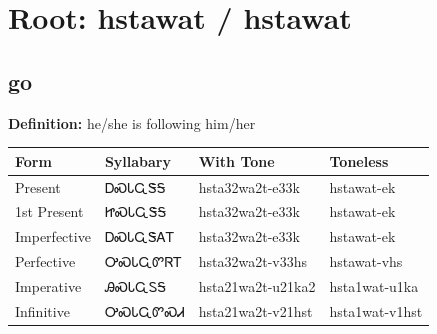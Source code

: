 \documentclass{article}%
\begin{document}
%
\normalsize%
\section*{Root: hstawat / hstawat}%
\subsection*{go}%
\textbf{Definition: }%
he/she is following him/her%
\\[0.5em]%
\begin{tabular}{|l|l|l|l|}%
\hline%
\textbf{Form}&\textbf{Syllabary}&\textbf{With Tone}&\textbf{Toneless}\\%
\hline%
Present&ᎠᏍᏓᏩᏕᎦ&hsta32wa2t{-}e33k&hstawat{-}ek\\%
1st Present&ᏥᏍᏓᏩᏕᎦ&hsta32wa2t{-}e33k&hstawat{-}ek\\%
Imperfective&ᎠᏍᏓᏩᏕᎪᎢ&hsta32wa2t{-}e33k&hstawat{-}ek\\%
Perfective&ᎤᏍᏓᏩᏛᏒᎢ&hsta32wa2t{-}v33hs&hstawat{-}vhs\\%
Imperative&ᎯᏍᏓᏩᏚᎦ&hsta21wa2t{-}u21ka2&hsta1wat{-}u1ka\\%
Infinitive&ᎤᏍᏓᏩᏛᏍᏗ&hsta21wa2t{-}v21hst&hsta1wat{-}v1hst\\%
\hline%
\end{tabular}%
\\[1em]%
\end{document}
